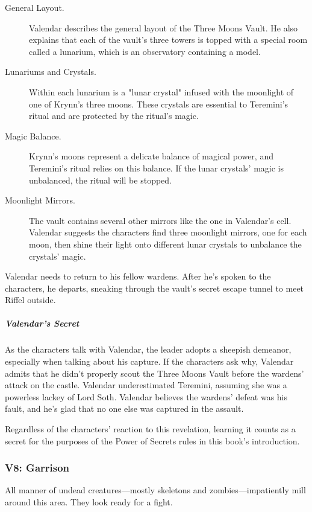 \documentclass[10pt,a4paper,twoside,bg=print,twocolumn,openany,nodeprecatedcode]{dndbook}
\begin{document}
\begin{description}
\item[General Layout.]
Valendar describes the general layout of the Three Moons Vault. He also explains that each of the vault's three towers is topped with a special room called a lunarium, which is an observatory containing a model.
\item[Lunariums and Crystals.]
Within each lunarium is a "lunar crystal" infused with the moonlight of one of Krynn's three moons. These crystals are essential to Teremini's ritual and are protected by the ritual's magic.
\item[Magic Balance.]
Krynn's moons represent a delicate balance of magical power, and Teremini's ritual relies on this balance. If the lunar crystals' magic is unbalanced, the ritual will be stopped.
\item[Moonlight Mirrors.]
The vault contains several other mirrors like the one in Valendar's cell. Valendar suggests the characters find three moonlight mirrors, one for each moon, then shine their light onto different lunar crystals to unbalance the crystals' magic.
\end{description}

Valendar needs to return to his fellow wardens. After he's spoken to the characters, he departs, sneaking through the vault's secret escape tunnel to meet Riffel outside.

\subparagraph{Valendar's Secret}
As the characters talk with Valendar, the leader adopts a sheepish demeanor, especially when talking about his capture. If the characters ask why, Valendar admits that he didn't properly scout the Three Moons Vault before the wardens' attack on the castle. Valendar underestimated Teremini, assuming she was a powerless lackey of Lord Soth. Valendar believes the wardens' defeat was his fault, and he's glad that no one else was captured in the assault.

Regardless of the characters' reaction to this revelation, learning it counts as a secret for the purposes of the Power of Secrets rules in this book's introduction.

\subsubsection{V8: Garrison}
\begin{DndReadAloud}{}
All manner of undead creatures—mostly skeletons and zombies—impatiently mill around this area. They look ready for a fight.

\end{DndReadAloud}
\end{document}
